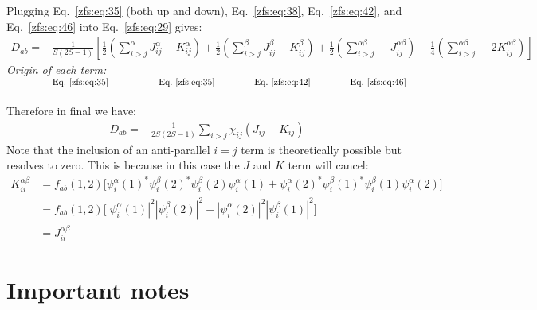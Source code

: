 Plugging Eq.~\ref{zfs:eq:35} (both up and down), Eq.~\ref{zfs:eq:38}, Eq.~\ref{zfs:eq:42}, and Eq.~\ref{zfs:eq:46} into Eq.~\ref{zfs:eq:29} gives:
\begin{align}
    D_{ab}
    =&\frac{1}{S(2S-1)} \left[
        \frac{1}{2}(\sum_{i>j}^{\alpha}J_{ij}^{\alpha} - K_{ij}^{\alpha})
        +\frac{1}{2}(\sum_{i>j}^{\beta}J_{ij}^{\beta} - K_{ij}^{\beta})
        +\frac{1}{2}(\sum_{i>j}^{\alpha\beta}-J_{ij}^{\alpha\beta})
        -\frac{1}{4}(\sum_{i>j}^{\alpha\beta}-2K_{ij}^{\alpha\beta})
        \right]
\end{align}
\textit{Origin of each term:} $\hspace{1.7cm}\text{Eq.~\ref{zfs:eq:35}}
\hspace{1.9cm}\text{Eq.~\ref{zfs:eq:35}}
\hspace{1.5cm}\text{Eq.~\ref{zfs:eq:42}}
\hspace{1.5cm}\text{Eq.~\ref{zfs:eq:46}}$\\
\\
Therefore in final we have:
\begin{align}
    D_{ab}
    =&\frac{1}{2S(2S-1)}
        \sum_{i>j}\chi_{ij}(J_{ij} - K_{ij})
    \label{zfs:eq:48}
\end{align}
Note that the inclusion of an anti-parallel $i=j$ term is theoretically possible but resolves to zero. This is because in this case the $J$ and $K$ term will cancel:
\begin{align}
    K_{ii}^{\alpha\beta} &= f_{ab}(1,2) \bigg[
    \psi_i^\alpha(1)^*\psi_i^\beta(2)^*\psi_i^\beta(2)\psi_i^\alpha(1)
    + \psi_i^\alpha(2)^*\psi_i^\beta(1)^*\psi_i^\beta(1)\psi_i^\alpha(2)
    \bigg]  \\
    &=f_{ab}(1,2) \bigg[
    |\psi_i^\alpha(1)|^2|\psi_i^\beta(2)|^2
    + |\psi_i^\alpha(2)|^2|\psi_i^\beta(1)|^2
    \bigg] \\
    &= J_{ii}^{\alpha\beta}
\end{align}


\section{Important notes}

